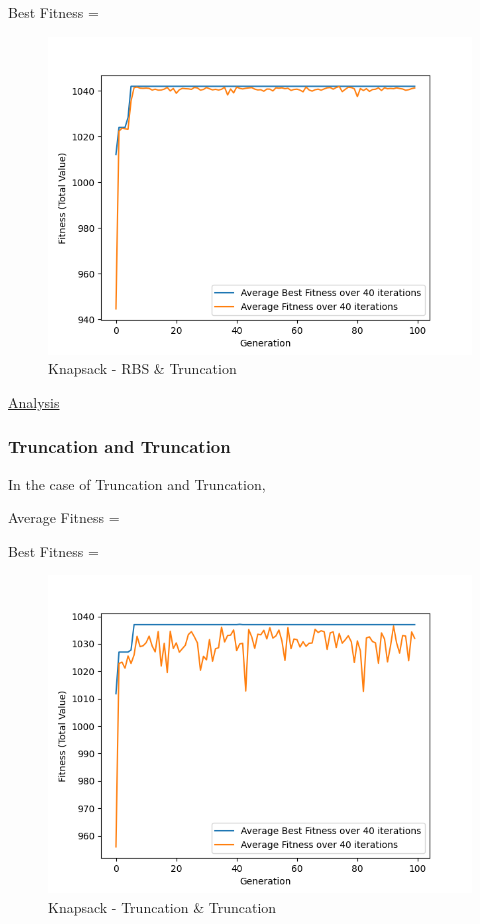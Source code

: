 \documentclass[11pt, letterpaper]{article}
\begin{document}
Best Fitness = 
\begin{figure}[h]
    \centering
    \includegraphics[scale = 0.6]{images/knapsack_rb_tr.png}
    \caption {Knapsack - RBS \& Truncation}
    \label {fig:kpBT}
\end{figure}

\underline{Analysis}

\subsubsection {Truncation and Truncation}
In the case of Truncation and Truncation,

Average Fitness = 

Best Fitness = 
\begin{figure}[H]
    \centering
    \includegraphics[scale = 0.6]{images/knapsack_tr_tr.png}
    \caption {Knapsack - Truncation \& Truncation}
    \label {fig:kpTT}
\end{figure}
\end{document}
